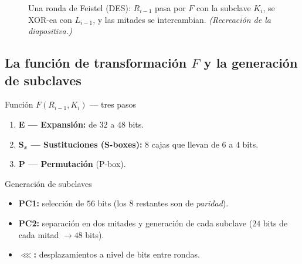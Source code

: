 \documentclass[11pt,a4paper]{article}
\newcommand{\xor}{\oplus}
\begin{document}
\begin{figure}[h]
\centering
{}
\caption{Una ronda de Feistel (DES): $R_{i-1}$ pasa por $F$ con la subclave $K_i$, se
XOR-ea con $L_{i-1}$, y las mitades se intercambian. \textit{(Recreación de la
diapositiva.)}}
\end{figure}

\subsection{La función de transformación $F$ y la generación de subclaves}

\begin{defbox}{Función $F(R_{i-1},K_i)$ — tres pasos}
\begin{enumerate}[leftmargin=1.5em,itemsep=1pt]
  \item \textbf{E — Expansión:} de $32$ a $48$ bits.
  \item \textbf{S$_x$ — Sustituciones (S-boxes):} $8$ cajas que llevan de $6$ a $4$ bits.
  \item \textbf{P — Permutación} (P-box).
\end{enumerate}
\end{defbox}

\begin{defbox}{Generación de subclaves}
\begin{itemize}[leftmargin=1.4em,itemsep=1pt]
  \item \textbf{PC1:} selección de $56$ bits (los $8$ restantes son de \emph{paridad}).
  \item \textbf{PC2:} separación en dos mitades y generación de cada subclave
        ($24$ bits de cada mitad $\to 48$ bits).
  \item \textbf{$\lll$:} desplazamientos a nivel de bits entre rondas.
\end{itemize}
\end{defbox}
\end{document}
